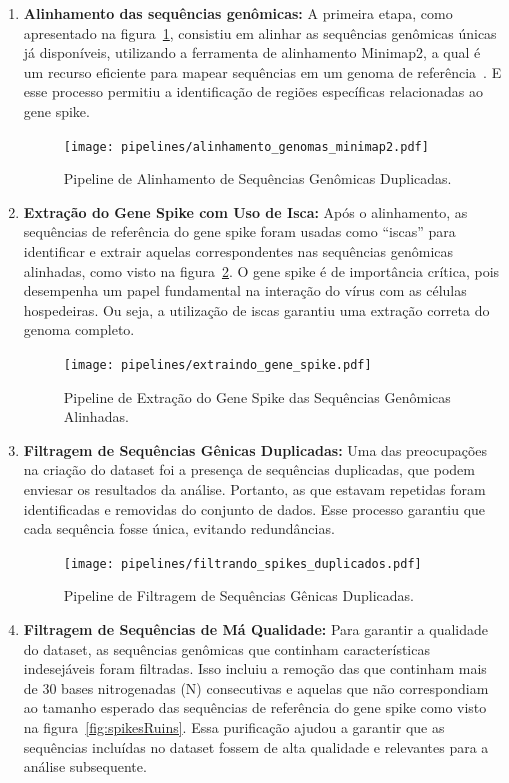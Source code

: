 \begin{enumerate}
  \item \textbf{Alinhamento das sequências genômicas:} A primeira etapa, como apresentado na figura~\ref{fig:alinhamentoGenomas}, consistiu em alinhar as sequências genômicas únicas já disponíveis, utilizando a ferramenta de alinhamento Minimap2, a qual é um recurso eficiente para mapear sequências em um genoma de referência~\cite{minimap2_li_2018}. E esse processo permitiu a identificação de regiões específicas relacionadas ao gene spike.
        \begin{figure}[htb]
          \centering
          \caption{Pipeline de Alinhamento de Sequências Genômicas Duplicadas.}
          \texttt{[image: pipelines/alinhamento\_genomas\_minimap2.pdf]}
          ~\label{fig:alinhamentoGenomas}
        \end{figure}
  \item \textbf{Extração do Gene Spike com Uso de Isca:} Após o alinhamento, as sequências de referência do gene spike foram usadas como ``iscas'' para identificar e extrair aquelas correspondentes nas sequências genômicas alinhadas, como visto na figura~\ref{fig:extracaoSpike}. O gene spike é de importância crítica, pois desempenha um papel fundamental na interação do vírus com as células hospedeiras. Ou seja, a utilização de iscas garantiu uma extração correta do genoma completo.
        \begin{figure}[htb]
          \centering
          \caption{Pipeline de Extração do Gene Spike das Sequências Genômicas Alinhadas.}
          \texttt{[image: pipelines/extraindo\_gene\_spike.pdf]}
          ~\label{fig:extracaoSpike}
        \end{figure}
  \item \textbf{Filtragem de Sequências Gênicas Duplicadas:} Uma das preocupações na criação do dataset foi a presença de sequências duplicadas, que podem enviesar os resultados da análise. Portanto, as que estavam repetidas foram identificadas e removidas do conjunto de dados. Esse processo garantiu que cada sequência fosse única, evitando redundâncias.
        \begin{figure}[htb]
          \centering
          \caption{Pipeline de Filtragem de Sequências Gênicas Duplicadas.}
          \texttt{[image: pipelines/filtrando\_spikes\_duplicados.pdf]}
          ~\label{fig:spikeDuplicados}
        \end{figure}
  \item \textbf{Filtragem de Sequências de Má Qualidade:} Para garantir a qualidade do dataset, as sequências genômicas que continham características indesejáveis foram filtradas. Isso incluiu a remoção das que continham mais de 30 bases nitrogenadas (N) consecutivas e aquelas que não correspondiam ao tamanho esperado das sequências de referência do gene spike como visto na figura~\ref{fig:spikesRuins}. Essa purificação ajudou a garantir que as sequências incluídas no dataset fossem de alta qualidade e relevantes para a análise subsequente.

\end{enumerate}
